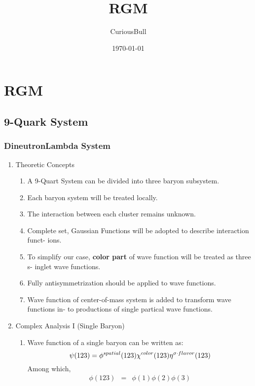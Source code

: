 \documentclass[11pt]{article}
\author{CuriousBull}
\date{\today}
\title{RGM}
\begin{document}
\maketitle
\tableofcontents

\section{RGM}
\label{sec-1}
\subsection{9-Quark System}
\label{sec-1-1}
\subsubsection{DineutronLambda System}
\label{sec-1-1-1}
\begin{enumerate}
\item Theoretic Concepts
\label{sec-1-1-1-1}
\begin{enumerate}
\item A 9-Quart System can be divided into three baryon subsystem.
\item Each baryon system will be treated locally.
\item The interaction between each cluster remains unknown.
\item Complete set, Gaussian Functions will be adopted to describe interaction funct-
ions.
\item To simplify our case, \textbf{color part} of wave function will be treated as three s-
inglet wave functions.
\item Fully antisymmetrization should be applied to wave functions.
\item Wave function of center-of-mass system is added to transform wave functions in-
to productions of single partical wave functions.
\end{enumerate}
\item Complex Analysis I (Single Baryon)
\label{sec-1-1-1-2}
\begin{enumerate}
\item Wave function of a single baryon can be written as:
\begin{equation}
\psi(123)=\phi^{spatial}(123)\chi^{color}(123)\eta^{\sigma\cdot{}flavor}(123)\\
\end{equation}
Among which,\\
\begin{eqnarray}
\phi(123)&=&\phi(1)\phi(2)\phi(3)\\

\end{eqnarray}
\end{enumerate}
\end{enumerate}
\end{document}
